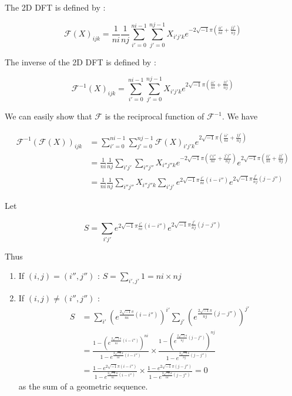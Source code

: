 The 2D DFT is defined by :

\begin{equation*}
\mathcal{F}(X)_{ijk}=\frac{1}{ni}\frac{1}{nj}\sum_{i'=0}^{ni-1}\sum_{j'=0}^{nj-1}X_{i'j'k}e^{-2\sqrt{-1}\pi\left(\frac{ii'}{ni}+\frac{jj'}{nj}\right)}
\end{equation*}

The inverse of the 2D DFT is defined by :

\begin{equation*}
\mathcal{F}^{-1}(X)_{ijk}=\sum_{i'=0}^{ni-1}\sum_{j'=0}^{nj-1}X_{i'j'k}e^{2\sqrt{-1}\pi\left(\frac{ii'}{ni}+\frac{jj'}{nj}\right)}
\end{equation*}

We can easily show that $\mathcal{F}$ is the reciprocal function of $\mathcal{F}^{-1}$. We have 

\begin{align*}
	\mathcal{F}^{-1}(\mathcal{F}(X))_{ijk}&=\sum_{i'=0}^{ni-1}\sum_{j'=0}^{nj-1}\mathcal{F}(X)_{i'j'k}e^{2\sqrt{-1}\pi\left(\frac{ii'}{ni}+\frac{jj'}{nj}\right)} \\	
	&=\frac{1}{ni}\frac{1}{nj}\sum_{i'j'}\sum_{i''j''}X_{i''j''k}e^{-2\sqrt{-1}\pi\left(\frac{i'i''}{ni}+\frac{j'j''}{nj}\right)}e^{2\sqrt{-1}\pi\left(\frac{ii'}{ni}+\frac{jj'}{nj}\right)} \\
	&=\frac{1}{ni}\frac{1}{nj}\sum_{i''j''}X_{i''j''k}\sum_{i'j'}e^{2\sqrt{-1}\pi\frac{i'}{ni}(i-i'')}e^{2\sqrt{-1}\pi\frac{j'}{nj}(j-j'')}
\end{align*}

Let

\begin{equation*}
	S=\sum_{i'j'}e^{2\sqrt{-1}\pi\frac{i'}{ni}(i-i'')}e^{2\sqrt{-1}\pi\frac{j'}{nj}(j-j'')}
\end{equation*}

Thus
\begin{enumerate}[label=\textbullet]
	\item If $(i,j)=(i'',j'')$ : $S=\sum_{i',j'}1=ni\times nj$
	\item If $(i,j)\ne(i'',j'')$ : 
	\begin{align*}
		S&=\sum_{i'}\left(e^{\frac{2\sqrt{-1}\pi}{ni}(i-i'')}\right)^{i'}\sum_{j'}\left(e^{\frac{2\sqrt{-1}\pi}{nj}(j-j'')}\right)^{j'} \\
		&=\frac{1-\left(e^{\frac{2\sqrt{-1}\pi}{ni}(i-i'')}\right)^{ni}}{1-e^{\frac{2\sqrt{-1}\pi}{ni}(i-i'')}}\times \frac{1-\left(e^{\frac{2\sqrt{-1}\pi}{nj}(j-j'')}\right)^{nj}}{1-e^{\frac{2\sqrt{-1}\pi}{nj}(j-j'')}} \\
		&=\frac{1-e^{2\sqrt{-1}\pi(i-i'')}}{1-e^{\frac{2\sqrt{-1}\pi}{ni}(i-i'')}}\times \frac{1-e^{2\sqrt{-1}\pi(j-j'')}}{1-e^{\frac{2\sqrt{-1}\pi}{ni}(j-j'')}}=0
	\end{align*}
	as the sum of a geometric sequence.
\end{enumerate}

